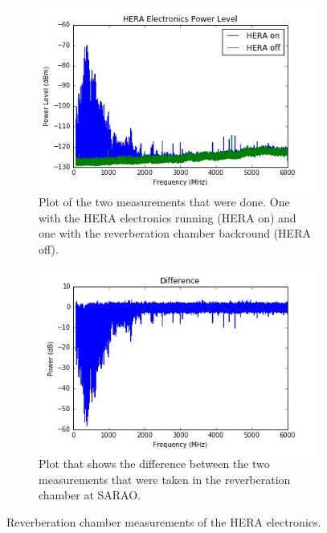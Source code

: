 \documentclass[12pt,a4paper]{report}
\begin{document}
{{			\begin{figure}[h!]
				\centering
				\begin{subfigure}[b]{0.49\textwidth}
					\includegraphics[width=\textwidth]{HERA.jpeg}
					\caption{Plot of the two measurements that were done. One with the HERA electronics running (HERA on) and one with the reverberation chamber backround (HERA off).}
					\label{fig:HERA}
				\end{subfigure}
				\hfill
				\begin{subfigure}[b]{0.49\textwidth}
					\includegraphics[width=\textwidth]{Diff.jpeg}
					\caption{Plot that shows the difference between the two measurements that were taken in the reverberation chamber at SARAO.}
					\label{fig:Diff}
				\end{subfigure}
				\caption{Reverberation chamber measurements of the HERA electronics.}
			\end{figure}
			
}}
\end{document}
